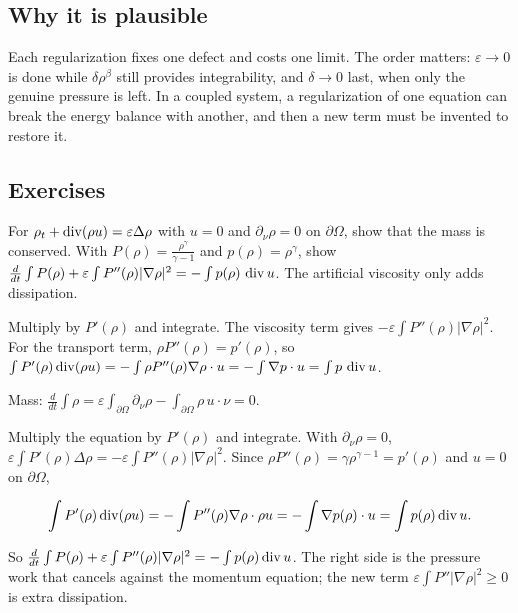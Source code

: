 \subsection*{Why it is plausible}

Each regularization fixes one defect and costs one limit. The order matters: $\varepsilon\to0$ is done while $\delta\rho^\beta$ still provides integrability, and $\delta\to0$ last, when only the genuine pressure is left. In a coupled system, a regularization of one equation can break the energy balance with another, and then a new term must be invented to restore it.

\subsection*{Exercises}

\begin{exercise}
  For $\rho_t + \operatorname{div}(\rho u) = \varepsilon\Delta\rho$ with $u = 0$ and $\partial_\nu\rho = 0$ on $\partial\Omega$, show that the mass is conserved. With $P(\rho) = \frac{\rho^\gamma}{\gamma-1}$ and $p(\rho) = \rho^\gamma$, show $\frac{d}{dt}\int P(\rho) + \varepsilon\int P''(\rho)|\nabla\rho|^2 = -\int p(\rho)\,\operatorname{div} u$. The artificial viscosity only adds dissipation.
  \begin{hint}
    Multiply by $P'(\rho)$ and integrate. The viscosity term gives $-\varepsilon\int P''(\rho)|\nabla\rho|^2$. For the transport term, $\rho P''(\rho) = p'(\rho)$, so $\int P'(\rho)\operatorname{div}(\rho u) = -\int\rho P''(\rho)\nabla\rho\cdot u = -\int\nabla p\cdot u = \int p\,\operatorname{div} u$.
  \end{hint}
  \begin{solution}
    Mass: $\frac{d}{dt}\int\rho = \varepsilon\int_{\partial\Omega}\partial_\nu\rho - \int_{\partial\Omega}\rho\,u\cdot\nu = 0$.

    Multiply the equation by $P'(\rho)$ and integrate. With $\partial_\nu\rho = 0$, $\varepsilon\int P'(\rho)\Delta\rho = -\varepsilon\int P''(\rho)|\nabla\rho|^2$. Since $\rho P''(\rho) = \gamma\rho^{\gamma-1} = p'(\rho)$ and $u = 0$ on $\partial\Omega$,

    \[ \int P'(\rho)\operatorname{div}(\rho u) = -\int P''(\rho)\nabla\rho\cdot\rho u = -\int\nabla p(\rho)\cdot u = \int p(\rho)\operatorname{div} u. \]

    So $\frac{d}{dt}\int P(\rho) + \varepsilon\int P''(\rho)|\nabla\rho|^2 = -\int p(\rho)\operatorname{div} u$. The right side is the pressure work that cancels against the momentum equation; the new term $\varepsilon\int P''|\nabla\rho|^2 \ge 0$ is extra dissipation.
  \end{solution}
\end{exercise}

